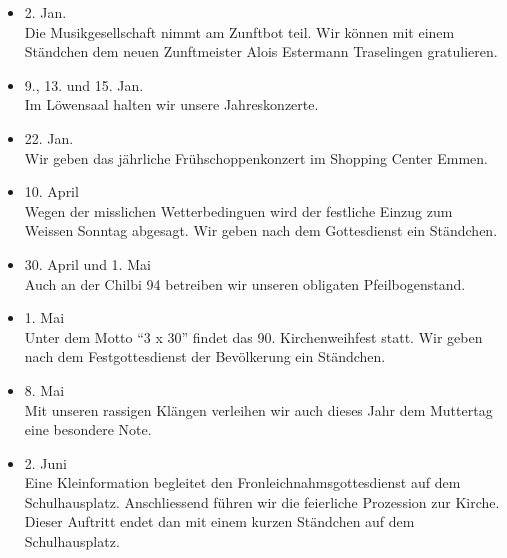 \begin{history}


    \begin{itemize}

        \item[]2. Jan.\\
        Die Musikgesellschaft nimmt am Zunftbot teil. Wir können mit einem
        Ständchen dem neuen Zunftmeister Alois Estermann Traselingen
        gratulieren.

        \item[]9., 13. und 15. Jan.\\
        Im Löwensaal halten wir unsere Jahreskonzerte.

        \item[]22. Jan.\\
        Wir geben das jährliche Frühschoppenkonzert im Shopping Center Emmen.

        \item[]10. April\\
        Wegen der misslichen Wetterbedinguen wird der festliche Einzug zum
        Weissen Sonntag abgesagt. Wir geben nach dem Gottesdienst ein Ständchen.

        \item[]30. April und 1. Mai\\
        Auch an der Chilbi 94 betreiben wir unseren obligaten Pfeilbogenstand.

        \item[]1. Mai\\
        Unter dem Motto \enquote{3 x 30} findet das 90. Kirchenweihfest statt.
        Wir geben nach dem Festgottesdienst der Bevölkerung ein Ständchen.

        \item[]8. Mai\\
        Mit unseren rassigen Klängen verleihen wir auch dieses Jahr dem
        Muttertag eine besondere Note.

        \item[]2. Juni\\
        Eine Kleinformation begleitet den Fronleichnahmsgottesdienst auf dem
        Schulhausplatz. Anschliessend führen wir die feierliche Prozession zur
        Kirche. Dieser Auftritt endet dan mit einem kurzen Ständchen auf dem
        Schulhausplatz.


\end{itemize}
\end{history}
